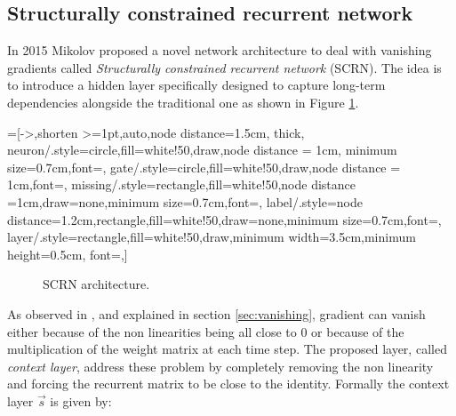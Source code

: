 \subsection{Structurally constrained recurrent network}

In 2015 Mikolov proposed a novel network architecture to deal with vanishing gradients \cite{scrn} called 
\textit{Structurally constrained recurrent network} (SCRN). The idea is to introduce a hidden layer specifically 
designed to capture long-term dependencies alongside the traditional one as shown in Figure \ref{fig:scrn}.


=[->,shorten >=1pt,auto,node distance=1.5cm,
  thick,
  neuron/.style={circle,fill=white!50,draw,node distance = 1cm, minimum size=0.7cm,font=\sffamily\Large\bfseries},
  gate/.style={circle,fill=white!50,draw,node distance = 1cm,font=\sffamily\small\bfseries},
  missing/.style={rectangle,fill=white!50,node distance =1cm,draw=none,minimum size=0.7cm,font=\sffamily\Huge\bfseries},
  label/.style={node distance=1.2cm,rectangle,fill=white!50,draw=none,minimum size=0.7cm,font=\sffamily\normalsize},
  layer/.style={rectangle,fill=white!50,draw,minimum width=3.5cm,minimum height=0.5cm, font=\sffamily\normalsize},]
\begin{figure}[!ht]
 \centering
{}
\caption{SCRN architecture.}
\label{fig:scrn}
\end{figure}


As observed in \cite{scrn}, and explained in section \ref{sec:vanishing}, gradient can vanish either because of the 
non linearities being all close to 0 or because of the multiplication of the weight matrix at each time step. The proposed 
layer, called \textit{context layer}, address these problem by completely removing the non linearity and forcing the 
recurrent matrix to be close to the identity. Formally the context layer  $\vec{s}$ is given by:

